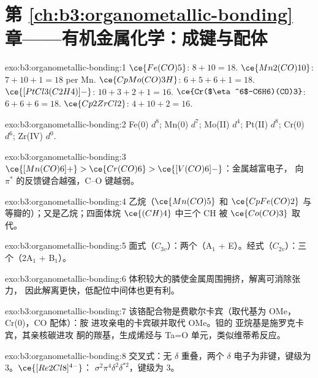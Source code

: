 \section*{第 \ref{ch:b3:organometallic-bonding} 章——有机金属化学：成键与配体}

\begin{solution}{exo:b3:organometallic-bonding:1}
$\ce{Fe(CO)5}$: $8 + 10 = 18$. $\ce{Mn2(CO)10}$: $7 + 10 + 1 = 18$ per Mn. $\ce{CpMo(CO)3H}$: $6 + 5 + 6 + 1 =
18$. $\ce{[PtCl3(C2H4)]-}$: $10 + 3 + 2 + 1 = 16$. $\ce{Cr($\eta^6$-C6H6)(CO)3}$: $6 + 6 + 6 = 18$. $\ce{Cp2ZrCl2}$:
$4 + 10 + 2 = 16$.
\end{solution}

\begin{solution}{exo:b3:organometallic-bonding:2}
Fe(0) $d^8$; Mn(0) $d^7$; Mo(II) $d^4$; Pt(II) $d^8$; Cr(0) $d^6$; Zr(IV) $d^0$.
\end{solution}

\begin{solution}{exo:b3:organometallic-bonding:3}
$\ce{[Mn(CO)6]+} > \ce{Cr(CO)6} > \ce{[V(CO)6]-}$：金属越富电子，
向 $\pi^*$ 的反馈键合越强，C--O 键越弱。
\end{solution}

\begin{solution}{exo:b3:organometallic-bonding:4}
乙烷（$\ce{Mn(CO)5}$ 和 $\ce{CpFe(CO)2}$ 与  等瓣的）；又是乙烷；四面体烷
$\ce{(CH)4}$ 中三个 CH 被 $\ce{Co(CO)3}$ 取代。
\end{solution}

\begin{solution}{exo:b3:organometallic-bonding:5}
$面式$（$C_{3v}$）：两个（A$_1$ + E）。$经式$（$C_{2v}$）：三个（2A$_1$ + B$_1$）。
\end{solution}

\begin{solution}{exo:b3:organometallic-bonding:6}
体积较大的膦使金属周围拥挤，解离可消除张力，
因此解离更快，低配位中间体也更有利。
\end{solution}

\begin{solution}{exo:b3:organometallic-bonding:7}
该铬配合物是费歇尔卡宾（取代基为 OMe，Cr(0)，CO 配体）：胺
进攻亲电的卡宾碳并取代 OMe。钽的
亚烷基是施罗克卡宾，其亲核碳进攻
酮的羰基，生成烯烃与 Ta=O 单元，类似维蒂希反应。
\end{solution}

\begin{solution}{exo:b3:organometallic-bonding:8}
交叉式：无 $\delta$ 重叠，两个 $\delta$ 电子为非键，键级为 3。$\ce{[Re2Cl8]^{4-}}$：
$\sigma^2\pi^4\delta^2\delta^{\ast2}$，键级为 3。
\end{solution}

